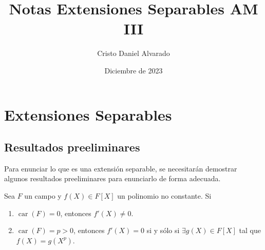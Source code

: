\documentclass[12pt]{report}
\theoremstyle{largebreak}
\DeclareMathOperator{\car}{car}
\begin{document}
    \setlength{\parskip}{5pt} %
    \setlength{\parindent}{12pt} %
    \title{Notas Extensiones Separables AM III}
    \author{Cristo Daniel Alvarado}
    \date{Diciembre de 2023}
    \maketitle

    \tableofcontents %

    \setcounter{chapter}{3} %
    
    \chapter{Extensiones Separables}
    
    \section{Resultados preeliminares}
    
    Para enunciar lo que es una extensión separable, se necesitarán demostrar algunos resultados preeliminares para enunciarlo de forma adecuada.

    \begin{propo}
        Sea $F$ un campo y $f(X)\in F[X]$ un polinomio no constante. Si
        \begin{enumerate}
            \item $\car(F)=0$, entonces $f'(X)\neq0$. \label{F_1}
            \item $\car(F)=p>0$, entonces $f'(X)=0$  si y sólo si $\exists g(X)\in F[X]$ tal que $f(X)=g(X^{p})$. \label{F_2}
        \end{enumerate}
    \end{propo}
\end{document}

